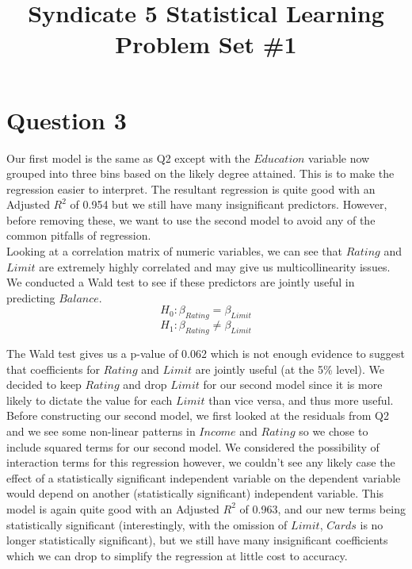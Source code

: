 \documentclass[11pt]{article}
\begin{document}
\title{Syndicate 5 Statistical Learning Problem Set \#1}
\maketitle
{}
{\setlength{\parindent}{0cm}


\section*{Question 3}
Our first model is the same as Q2 except with the $Education$ variable now grouped into three bins based on the likely degree attained. This is to make the regression easier to interpret. The resultant regression is quite good with an Adjusted $R^2$ of 0.954 but we still have many insignificant predictors. However, before removing these, we want to use the second model to avoid any of the common pitfalls of regression.\\

Looking at a correlation matrix of numeric variables, we can see that $Rating$ and $Limit$ are extremely highly correlated and may give us multicollinearity issues. We conducted a Wald test to see if these predictors are jointly useful in predicting $Balance$. 
$$H_0: \beta_{Rating} = \beta_{Limit}$$
$$H_1: \beta_{Rating} \neq \beta_{Limit}$$

The Wald test gives us a p-value of 0.062 which is not enough evidence to suggest that coefficients for $Rating$ and $Limit$ are jointly useful (at the 5\% level). We decided to keep $Rating$ and drop $Limit$ for our second model since it is more likely to dictate the value for each $Limit$ than vice versa, and thus more useful.\\

Before constructing our second model, we first looked at the residuals from Q2 and we see some non-linear patterns in $Income$ and $Rating$ so we chose to include squared terms for our second model. We considered the possibility of interaction terms for this regression however, we couldn't see any likely case the effect of a statistically significant independent variable on the dependent variable would depend on another (statistically significant) independent variable. This model is again quite good with an Adjusted $R^2$ of 0.963, and our new terms being statistically significant (interestingly, with the omission of $Limit$, $Cards$ is no longer statistically significant), but we still have many insignificant coefficients which we can drop to simplify the regression at little cost to accuracy.\\

}
\end{document}
